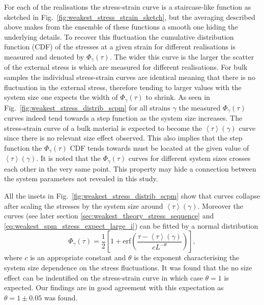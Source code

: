 For each of the realisations the stress-strain curve is a staircase-like function as sketched in Fig.~\ref{fig:weakest_stress_strain_sketch}, but the averaging described above makes from the ensemble of these functions a smooth one hiding the underlying details. To recover this fluctuation the cumulative distribution function (CDF)  of the stresses at a given strain for different realisations is measured and denoted by ${\Phi _\gamma }\left( \tau  \right)$. The wider this curve is the larger the scatter of the external stress is which are measured for different realisations. For bulk samples the individual stress-strain curves are identical meaning that there is no fluctuation in the external stress, therefore tending to larger values with the system size one expects the width of ${\Phi _\gamma }\left( \tau  \right)$ to shrink. As seen in Fig.~\ref{fig:weakest_stress_distrib_scpm} for all strains $\gamma$ the measured ${\Phi _\gamma }\left( \tau  \right)$ curves indeed tend towards a step function as the system size increases. The stress-strain curve of a bulk material is expected to become the $\left\langle \tau  \right\rangle \left( \gamma  \right)$ curve since there is no relevant size effect observed. This also implies that the step function the ${\Phi _\gamma }\left( \tau  \right)$ CDF tends towards must be located at the given value of $\left\langle \tau  \right\rangle \left( \gamma  \right)$. It is noted that the ${\Phi _\gamma }\left( \tau  \right)$ curves for different system sizes crosses each other in the very same point. This property may hide a connection between the system parameters not revealed in this study.


All the insets in Fig.~\ref{fig:weakest_stress_distrib_scpm} show that curves collapse after scaling the stresses by the system size around $\left\langle \tau  \right\rangle \left( \gamma  \right)$. Moreover the curves (see later section \ref{sec:weakest_theory_stress_sequence} and \cref{eq:weakest_spm_stress_expect_large_i}) can be fitted by a normal distribution 
\begin{equation} \label{eq:weakest_stress_distrib}
{\Phi _\gamma }\left( \tau  \right) = \frac{1}{2}\left[ {1 + {\text{erf}}\left( {\frac{{\tau  - \left\langle \tau  \right\rangle \left( \gamma  \right)}}{{c{L^{ - \theta }}}}} \right)} \right],
\end{equation}
where $c$ is an appropriate constant and $\theta $ is the exponent characterising the system size dependence on the stress fluctuations. It was found that the no size effect can be indentified on the stress-strain curve in which case $\theta =1$ is expected. Our findings are in good agreement with this expectation as $\theta  = 1 \pm 0.05$ was found.

